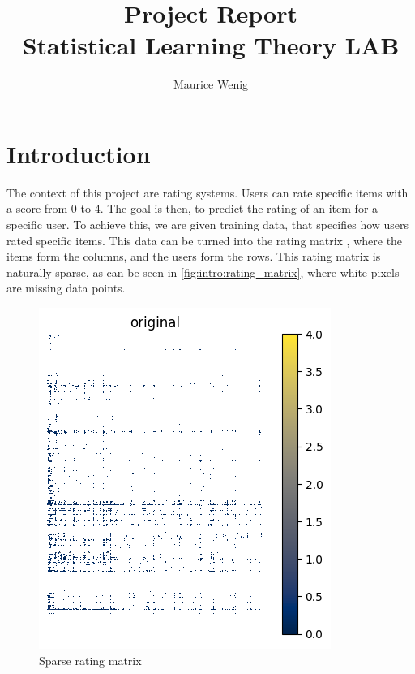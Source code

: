 \documentclass[sigconf]{acmart}
\begin{document}
\title[Project Report]{Project Report\\\large Statistical Learning Theory LAB}


\author{Maurice Wenig}


\maketitle



\section{Introduction}
The context of this project are rating systems.
Users can rate specific items with a score from 0 to 4.
The goal is then, to predict the rating of an item for a specific user.
To achieve this, we are given training data, that specifies how users rated specific items.
This data can be turned into the rating matrix \cite[Chapter~1, Section~3]{Aggarwal2016}, where the items form the columns, and the users form the rows.
This rating matrix is naturally sparse, as can be seen in \autoref{fig:intro:rating_matrix}, where white pixels are missing data points.
\begin{figure}[!htb]
	\centering
	\includegraphics[scale=0.6]{matrix_original.png}
	\caption{Sparse rating matrix}
	\label{fig:intro:rating_matrix}
\end{figure}
\end{document}
